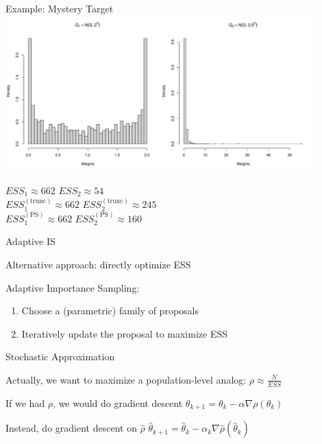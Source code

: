 \documentclass[14pt]{beamer}
\begin{document}
\begin{frame}{Example: Mystery Target}
    \centering
    \includegraphics[height=0.5\textheight, width=0.9\textwidth]{Figures/Wt Hist - Pareto Smooth.pdf}\newline
    \begin{outline}
        $ESS_1 \approx 662$ \hspace{2.5cm} $ESS_2 \approx 54$\\
        $ESS_1^{(\mathrm{trunc})} \approx 662$ \hspace{2.5cm} $ESS_2^{(\mathrm{trunc})} \approx 245$\\
        $ESS_1^{(\mathrm{PS})} \approx 662$ \hspace{2.5cm} $ESS_2^{(\mathrm{PS})} \approx 160$
    \end{outline}
\end{frame}


\begin{frame}{Adaptive IS}
    \begin{outline}
        \1 Alternative approach: directly optimize ESS \newline

        \1 Adaptive Importance Sampling: 
            \2 \citep{Aky21} \newline
    \end{outline}

    \begin{enumerate}
        [default]
        \item Choose a (parametric) family of proposals
        \item Iteratively update the proposal to maximize ESS
    \end{enumerate}
\end{frame}

\begin{frame}{Stochastic Approximation}
    \begin{outline}
        \1 Actually, we want to maximize a population-level analog: $\rho \approx \frac{N}{ESS}$ \newline

        \1 If we had $\rho$, we would do gradient descent
            \2 $\theta_{k+1} = \theta_k - \alpha \nabla \rho(\theta_k)$ \newline

        \1 Instead, do gradient descent on $\hat{\rho}$
            \2 $\hat{\theta}_{k+1} = \hat{\theta}_k - \alpha_k \nabla \hat{\rho}(\hat{\theta}_k)$
    \end{outline}
\end{frame}
\end{document}
